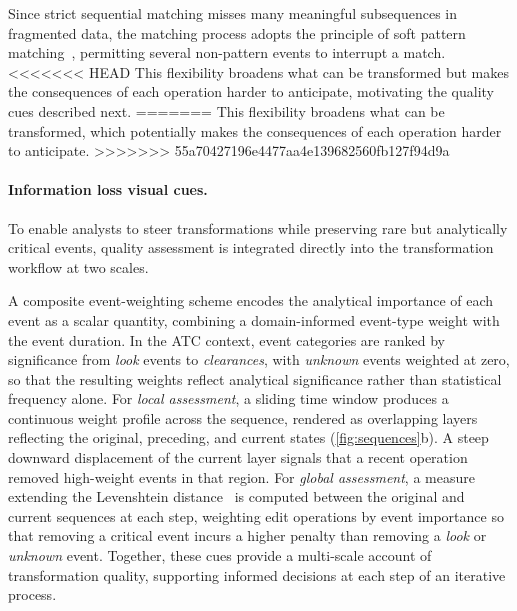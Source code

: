 Since strict sequential matching misses many meaningful subsequences in fragmented data, the matching process adopts the principle of soft pattern matching~\cite{gotz2016soft}, permitting several non-pattern events to interrupt a match.
<<<<<<< HEAD
This flexibility broadens what can be transformed but makes the consequences of each operation harder to anticipate, motivating the quality cues described next.
=======
This flexibility broadens what can be transformed, which potentially makes the consequences of each operation harder to anticipate.
>>>>>>> 55a70427196e4477aa4e139682560fb127f94d9a


\paragraph{Information loss visual cues.}
To enable analysts to steer transformations while preserving rare but analytically critical events, quality assessment is integrated directly into the transformation workflow at two scales.

A composite event-weighting scheme encodes the analytical importance of each event as a scalar quantity, combining a domain-informed event-type weight with the event duration.
In the ATC context, event categories are ranked by significance from \textit{look} events to \textit{clearances}, with \textit{unknown} events weighted at zero, so that the resulting weights reflect analytical significance rather than statistical frequency alone.
For \textit{local assessment}, a sliding time window produces a continuous weight profile across the sequence, rendered as overlapping layers reflecting the original, preceding, and current states (\cref{fig:sequences}b).
A steep downward displacement of the current layer signals that a recent operation removed high-weight events in that region.
For \textit{global assessment}, a measure extending the Levenshtein distance~\cite{levenshtein1966binary, hall1980approximate} is computed between the original and current sequences at each step, weighting edit operations by event importance so that removing a critical event incurs a higher penalty than removing a \textit{look} or \textit{unknown} event.
Together, these cues provide a multi-scale account of transformation quality, supporting informed decisions at each step of an iterative process.


